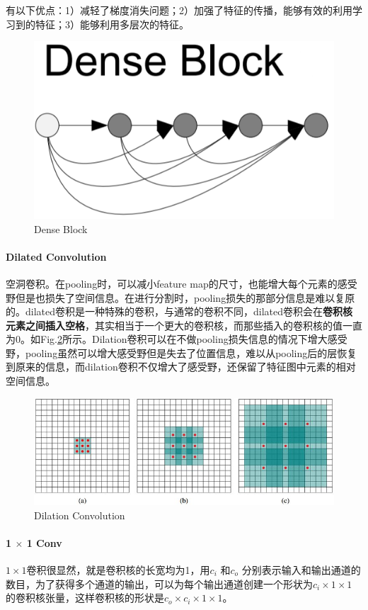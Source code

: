 有以下优点：1）减轻了梯度消失问题；2）加强了特征的传播，能够有效的利用学习到的特征；3）能够利用多层次的特征。
\begin{figure}[h]
	\centering
	\includegraphics[width=.4\textwidth]{pics/dense block.png}
	\caption{Dense Block}
	\label{fig:dense block}
\end{figure}

\paragraph{Dilated Convolution}空洞卷积。在pooling时，可以减小feature map的尺寸，也能增大每个元素的感受野但是也损失了空间信息。在进行分割时，pooling损失的那部分信息是难以复原的。dilated卷积是一种特殊的卷积，与通常的卷积不同，dilated卷积会在\textbf{卷积核元素之间插入空格}，其实相当于一个更大的卷积核，而那些插入的卷积核的值一直为0。如Fig.\ref{fig:dilation}所示。Dilation卷积可以在不做pooling损失信息的情况下增大感受野，pooling虽然可以增大感受野但是失去了位置信息，难以从pooling后的层恢复到原来的信息，而dilation卷积不仅增大了感受野，还保留了特征图中元素的相对空间信息。
\begin{figure}[h]
	\centering
	\includegraphics[width=.8\textwidth]{pics/dilation.jpg}
	\caption{Dilation Convolution}
	\label{fig:dilation}
\end{figure}

\paragraph{1 $\times$ 1 Conv}
$1\times 1$卷积很显然，就是卷积核的长宽均为1，用$c_i$ 和$c_o$  分别表示输入和输出通道的数目，为了获得多个通道的输出，可以为每个输出通道创建一个形状为$c_i\times 1 \times 1$ 的卷积核张量，这样卷积核的形状是$c_o \times c_i \times 1 \times 1$。

